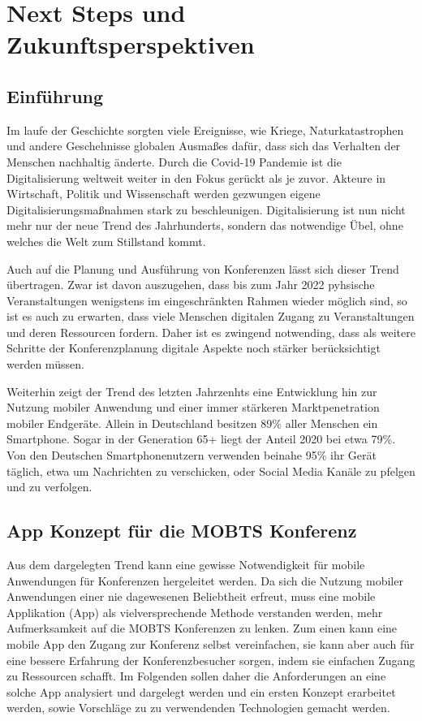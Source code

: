 \chapter{Next Steps und Zukunftsperspektiven}
\section{Einführung}
Im laufe der Geschichte sorgten viele Ereignisse, wie Kriege, Naturkatastrophen und andere Geschehnisse globalen Ausmaßes dafür, dass sich das Verhalten der Menschen nachhaltig änderte.
Durch die Covid-19 Pandemie ist die Digitalisierung weltweit weiter in den Fokus gerückt als je zuvor.
Akteure in Wirtschaft, Politik und Wissenschaft werden gezwungen eigene Digitalisierungsmaßnahmen stark zu beschleunigen.
Digitalisierung ist nun nicht mehr nur der neue Trend des Jahrhunderts, sondern das notwendige Übel, ohne welches die Welt zum Stillstand kommt.

Auch auf die Planung und Ausführung von Konferenzen lässt sich dieser Trend übertragen.
Zwar ist davon auszugehen, dass bis zum Jahr 2022 pyhsische Veranstaltungen wenigstens im eingeschränkten Rahmen wieder möglich sind, so ist es auch zu erwarten, dass viele Menschen digitalen Zugang zu Veranstaltungen und deren Ressourcen fordern.
Daher ist es zwingend notwending, dass als weitere Schritte der Konferenzplanung digitale Aspekte noch stärker berücksichtigt werden müssen.

Weiterhin zeigt der Trend des letzten Jahrzenhts eine Entwicklung hin zur Nutzung mobiler Anwendung und einer immer stärkeren Marktpenetration mobiler Endgeräte.
Allein in Deutschland besitzen 89\% aller Menschen ein Smartphone.
Sogar in der Generation 65+ liegt der Anteil 2020 bei etwa 79\%.
Von den Deutschen Smartphonenutzern verwenden beinahe 95\% ihr Gerät täglich, etwa um Nachrichten zu verschicken, oder Social Media Kanäle zu pfelgen und zu verfolgen. \autocite[]{B_Gentner.2020}

\section{App Konzept für die \ac{MOBTS} Konferenz}
Aus dem dargelegten Trend kann eine gewisse Notwendigkeit für mobile Anwendungen für Konferenzen hergeleitet werden.
Da sich die Nutzung mobiler Anwendungen einer nie dagewesenen Beliebtheit erfreut, muss eine mobile Applikation (App) als vielversprechende Methode verstanden werden, mehr Aufmerksamkeit auf die \ac{MOBTS} Konferenzen zu lenken.
Zum einen kann eine mobile App den Zugang zur Konferenz selbst vereinfachen, sie kann aber auch für eine bessere Erfahrung der Konferenzbesucher sorgen, indem sie einfachen Zugang zu Ressourcen schafft.
Im Folgenden sollen daher die Anforderungen an eine solche App analysiert und dargelegt werden und ein ersten Konzept erarbeitet werden, sowie Vorschläge zu zu verwendenden Technologien gemacht werden.

